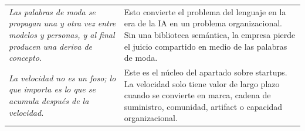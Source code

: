 \documentclass[a4paper]{article}
\begin{document}
\begin{longtable}{>{\raggedright\arraybackslash}p{} >{\raggedright\arraybackslash}p{}}
\textit{Las palabras de moda se propagan una y otra vez entre modelos y personas, y al final producen una deriva de concepto.} & Esto convierte el problema del lenguaje en la era de la IA en un problema organizacional. Sin una biblioteca semántica, la empresa pierde el juicio compartido en medio de las palabras de moda. \\
\textit{La velocidad no es un foso; lo que importa es lo que se acumula después de la velocidad.} & Este es el núcleo del apartado sobre startups. La velocidad solo tiene valor de largo plazo cuando se convierte en marca, cadena de suministro, comunidad, artifact o capacidad organizacional. \\
\bottomrule
\end{longtable}
\end{document}
